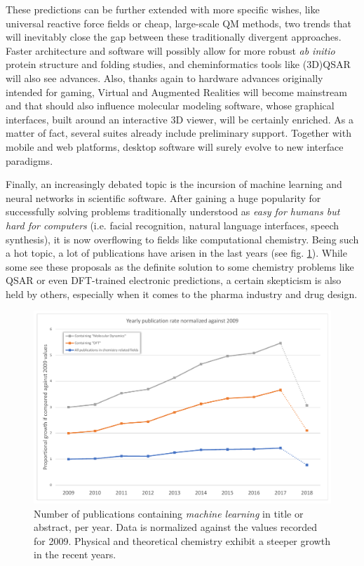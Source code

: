 These predictions can be further extended with more specific wishes, like universal reactive force fields or cheap, large-scale QM methods, two trends that will inevitably close the gap between these traditionally divergent approaches. Faster architecture and software will possibly allow for more robust \textit{ab initio} protein structure and folding studies,\cite{Lee2017} and cheminformatics tools like (3D)QSAR will also see advances.\cite{Cherkasov2013} Also, thanks again to hardware advances originally intended for gaming, Virtual and Augmented Realities will become mainstream and that should also influence molecular modeling software, whose graphical interfaces, built around an interactive 3D viewer, will be certainly enriched. As a matter of fact, several suites already include preliminary support.\cite{chimerax} Together with mobile and web platforms, desktop software will surely evolve to new interface paradigms.

Finally, an increasingly debated topic is the incursion of machine learning and neural networks in scientific software. After gaining a huge popularity for successfully solving problems traditionally understood as \textit{easy for humans but hard for computers} (i.e. facial recognition, natural language interfaces, speech synthesis), it is now overflowing to fields like computational chemistry. Being such a hot topic, a lot of publications have arisen in the last years (see fig. \ref{fig:machinelearningtrends}). While some see these proposals as the definite solution to some chemistry problems like QSAR\cite{paliwal2015,Ma2015,schutt2016,goh2017,goh2017b,koutsoukas2017,mayr2016} or even DFT-trained electronic predictions,\cite{faber2017} a certain skepticism is also held by others,\cite{forbes4decades,benhenda} especially when it comes to the pharma industry and drug design.


\begin{figure}[H]
	\includegraphics[width=\textwidth]{./figures/01/publication-trends-ml_crop.pdf}
	\caption[Machine learning publication trends]{Number of publications containing \textit{machine learning}  in title or abstract, per year. Data is normalized against the values recorded for 2009. Physical and theoretical chemistry exhibit a steeper growth in the recent years.}
	\label{fig:machinelearningtrends}
\end{figure}


